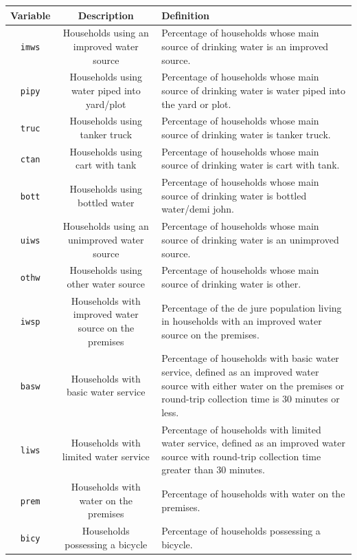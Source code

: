 \documentclass[10pt,twoside]{article}
\numberwithin{equation}{section}
\newcommand{\?}{\stackrel{?}{=}}
\begin{document}
\begin{table}[h!]
  \centering
  \begin{tabular}{c c m{7cm}}\toprule
    \bf Variable & \bf Description & \bf Definition \\\midrule
    \texttt{imws} & Households using an improved water source
 & Percentage of households whose main source of drinking water is an improved source.
 \\\hline
  \texttt{pipy} & Households using water piped into yard/plot
& Percentage of households whose main source of drinking water is water piped into the yard or plot.
\\\hline
 \texttt{truc} & Households using tanker truck & Percentage of households whose main source of drinking water is tanker truck.
\\\hline
 \texttt{ctan} & Households using cart with tank & Percentage of households whose main source of drinking water is cart with tank.
\\\hline
 \texttt{bott} & Households using bottled water & Percentage of households whose main source of drinking water is bottled water/demi john.
\\\hline
 \texttt{uiws} & Households using an unimproved water source & Percentage of households whose main source of drinking water is an unimproved source.
\\\hline
 \texttt{othw} & Households using other water source & Percentage of households whose main source of drinking water is other.
\\\hline
 \texttt{iwsp} & Households with improved water source on the premises & Percentage of the de jure population living in households with an improved water source on the premises.
\\\hline
 \texttt{basw} & Households with basic water service
 & Percentage of households with basic water service, defined as an improved water source with either water on the premises or round-trip collection time is 30 minutes or less.
\\\hline
 \texttt{liws} & Households with limited water service
 & Percentage of households with limited water service, defined as an improved water source with round-trip collection time greater than 30 minutes.
\\\hline
 \texttt{prem} & Households with water on the premises
 & Percentage of households with water on the premises.
\\\hline
 \texttt{bicy} & Households possessing a bicycle
 & Percentage of households possessing a bicycle.
\\\hline

\end{tabular}
\end{table}
\end{document}
